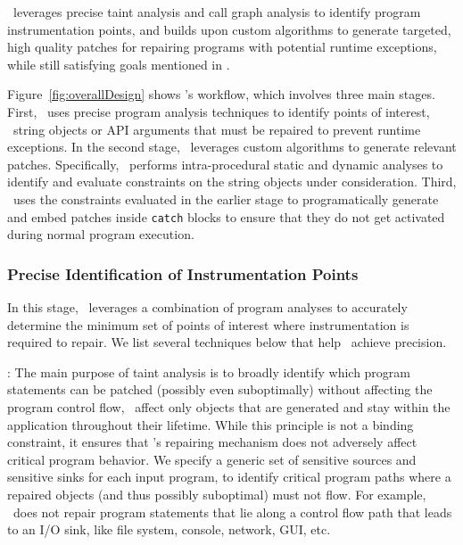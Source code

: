  \tool\ leverages precise taint analysis and
call graph analysis to identify program instrumentation points, and builds upon
custom algorithms to generate targeted, high quality patches for repairing
programs with potential runtime exceptions, while still satisfying goals
mentioned in .

Figure~\ref{fig:overallDesign} shows \tool's workflow, which involves three
main stages. First, \tool\ uses precise program analysis techniques to identify
points of interest, \ie\ string objects or API arguments that must be repaired
to prevent runtime exceptions. In the second stage, \tool\ leverages custom
algorithms to generate relevant patches. Specifically, \tool\ performs
intra-procedural static and dynamic analyses to identify and evaluate
constraints on the string objects under consideration. Third, \tool\ uses the
constraints evaluated in the earlier stage to programatically generate and embed
patches inside \texttt{catch} blocks to ensure that they do not get activated
during normal program execution.

\subsubsection{Precise Identification of Instrumentation Points}
\label{sec:tool:stage1}

In this stage, \tool\ leverages a combination of program analyses to accurately
determine the minimum set of points of interest where instrumentation is
required to repair. We list several techniques below that help \tool\ achieve
precision.

: The main purpose of taint analysis is to
broadly identify which program statements can be patched (possibly even
suboptimally) without affecting the program control flow, \ie\ affect only
objects that are generated and stay within the application throughout their
lifetime. While this principle is not a binding constraint, it ensures that
\tool's repairing mechanism does not adversely affect critical program behavior.
We specify a generic set of sensitive sources and sensitive sinks for each input
program, to identify critical program paths where a repaired 
objects (and thus possibly suboptimal) must not flow. For example, \tool\ does
not repair program statements that lie along a control flow path that leads to
an I/O sink, like file system, console, network, GUI, etc.

